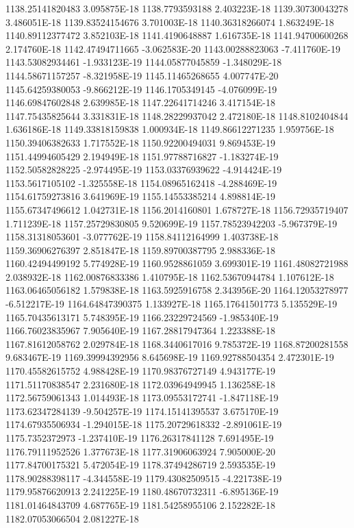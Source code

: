 1138.25141820483  3.095875E-18
1138.7793593188  2.403223E-18
1139.30730043278  3.486051E-18
1139.83524154676  3.701003E-18
1140.36318266074  1.863249E-18
1140.89112377472  3.852103E-18
1141.4190648887  1.616735E-18
1141.94700600268  2.174760E-18
1142.47494711665  -3.062583E-20
1143.00288823063  -7.411760E-19
1143.53082934461  -1.933123E-19
1144.05877045859  -1.348029E-18
1144.58671157257  -8.321958E-19
1145.11465268655  4.007747E-20
1145.64259380053  -9.866212E-19
1146.1705349145  -4.076099E-19
1146.69847602848  2.639985E-18
1147.22641714246  3.417154E-18
1147.75435825644  3.331831E-18
1148.28229937042  2.472180E-18
1148.8102404844  1.636186E-18
1149.33818159838  1.000934E-18
1149.86612271235  1.959756E-18
1150.39406382633  1.717552E-18
1150.92200494031  9.869453E-19
1151.44994605429  2.194949E-18
1151.97788716827  -1.183274E-19
1152.50582828225  -2.974495E-19
1153.03376939622  -4.914424E-19
1153.5617105102  -1.325558E-18
1154.08965162418  -4.288469E-19
1154.61759273816  3.641969E-19
1155.14553385214  4.898814E-19
1155.67347496612  1.042731E-18
1156.2014160801  1.678727E-18
1156.72935719407  1.711239E-18
1157.25729830805  9.520699E-19
1157.78523942203  -5.967379E-19
1158.31318053601  -3.077762E-19
1158.84112164999  1.403738E-18
1159.36906276397  2.851847E-18
1159.89700387795  2.988336E-18
1160.42494499192  5.774928E-19
1160.9528861059  3.699301E-19
1161.48082721988  2.038932E-18
1162.00876833386  1.410795E-18
1162.53670944784  1.107612E-18
1163.06465056182  1.579838E-18
1163.5925916758  2.343956E-20
1164.12053278977  -6.512217E-19
1164.64847390375  1.133927E-18
1165.17641501773  5.135529E-19
1165.70435613171  5.748395E-19
1166.23229724569  -1.985340E-19
1166.76023835967  7.905640E-19
1167.28817947364  1.223388E-18
1167.81612058762  2.029784E-18
1168.3440617016  9.785372E-19
1168.87200281558  9.683467E-19
1169.39994392956  8.645698E-19
1169.92788504354  2.472301E-19
1170.45582615752  4.988428E-19
1170.98376727149  4.943177E-19
1171.51170838547  2.231680E-18
1172.03964949945  1.136258E-18
1172.56759061343  1.014493E-18
1173.09553172741  -1.847118E-19
1173.62347284139  -9.504257E-19
1174.15141395537  3.675170E-19
1174.67935506934  -1.294015E-18
1175.20729618332  -2.891061E-19
1175.7352372973  -1.237410E-19
1176.26317841128  7.691495E-19
1176.79111952526  1.377673E-18
1177.31906063924  7.905000E-20
1177.84700175321  5.472054E-19
1178.37494286719  2.593535E-19
1178.90288398117  -4.344558E-19
1179.43082509515  -4.221738E-19
1179.95876620913  2.241225E-19
1180.48670732311  -6.895136E-19
1181.01464843709  4.687765E-19
1181.54258955106  2.152282E-18
1182.07053066504  2.081227E-18
